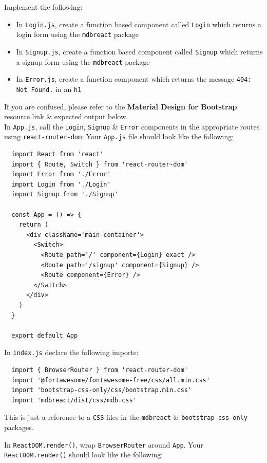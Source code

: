 \documentclass{article}
\begin{document}
Implement the following:
\begin{itemize}
  \item In \texttt{Login.js}, create a function based component called \texttt{Login} which returns a login form using the \texttt{mdbreact} package
  \item In \texttt{Signup.js}, create a function based component called \texttt{Signup} which returns a signup form using the \texttt{mdbreact} package
  \item In \texttt{Error.js}, create a function component which returns the message \texttt{404: Not Found.} in an \texttt{h1}
\end{itemize}

If you are confused, please refer to the \textbf{Material Design for Bootstrap} resource link \& expected output below. \\

In \texttt{App.js}, call the \texttt{Login}, \texttt{Signup} \& \texttt{Error} components in the appropriate routes using \texttt{react-router-dom}. Your \texttt{App.js} file should look like the following:

\begin{verbatim}
  import React from 'react'
  import { Route, Switch } from 'react-router-dom'
  import Error from './Error'
  import Login from './Login'
  import Signup from './Signup'
  
  const App = () => {
    return (
      <div className='main-container'>
        <Switch>
          <Route path='/' component={Login} exact />
          <Route path='/signup' component={Signup} />
          <Route component={Error} />
        </Switch>
      </div>
    )
  }
  
  export default App   
\end{verbatim}

In \texttt{index.js} declare the following imports:

\begin{verbatim}
  import { BrowserRouter } from 'react-router-dom'
  import '@fortawesome/fontawesome-free/css/all.min.css'
  import 'bootstrap-css-only/css/bootstrap.min.css'
  import 'mdbreact/dist/css/mdb.css' 
\end{verbatim}

This is just a reference to a \texttt{CSS} files in the \texttt{mdbreact} \& \texttt{bootstrap-css-only} packages.

In \texttt{ReactDOM.render()}, wrap \texttt{BrowserRouter} around \texttt{App}. Your \texttt{ReactDOM.render()} should look like the following:
\end{document}
